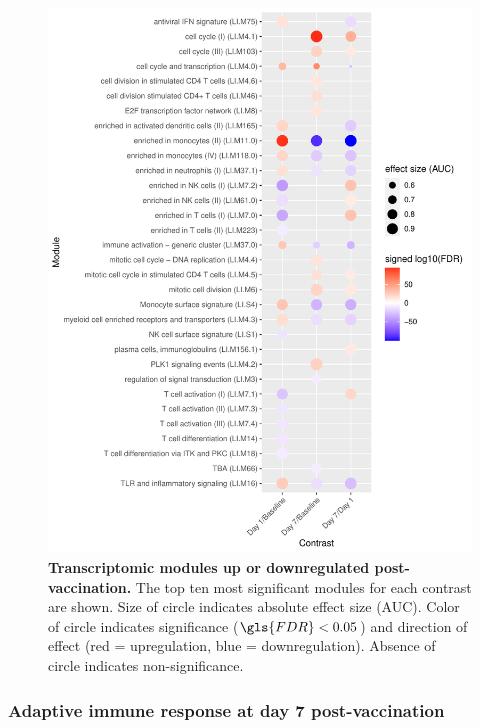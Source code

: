 \begin{figure}
    \includegraphics[width=1.0\textwidth]{mainmatter/figures/chapter_02/compare_dge_eqtl.tmodDotPlot.DGE.timepoint.pdf}
    \caption{
        \textbf{Transcriptomic modules up or downregulated post-vaccination.}
        The top ten most significant modules for each contrast are shown.
        Size of circle indicates absolute effect size (\gls{AUC}). 
        Color of circle indicates significance ($\gls{FDR} < 0.05$) and direction of effect (red = upregulation, blue = downregulation).
        Absence of circle indicates non-significance.
    }
    \label{fig:hird_tmodDotPlot_timepoint}
\end{figure}

\subsubsection{Adaptive immune response at day 7 post-vaccination}
\label{subsec:hird_dge_adaptive_immune_day7}

